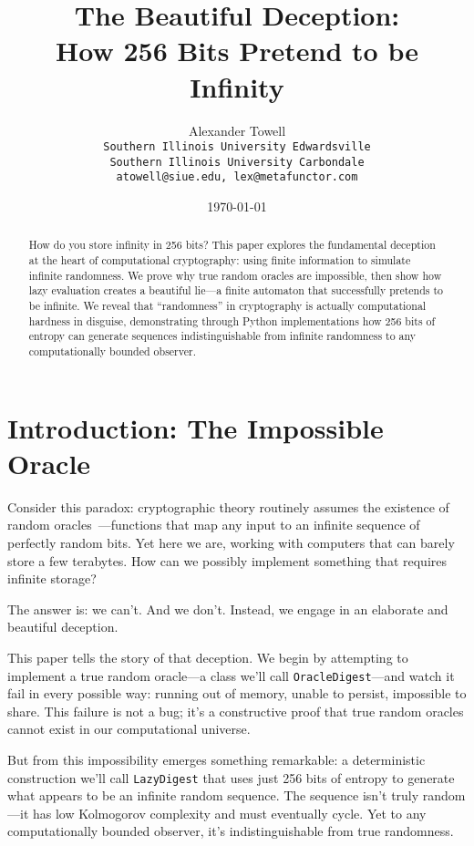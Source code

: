 \documentclass[11pt]{article}
\title{The Beautiful Deception:\\
How 256 Bits Pretend to be Infinity}
\author{
    Alexander Towell\\
    \texttt{Southern Illinois University Edwardsville}\\
    \texttt{Southern Illinois University Carbondale}\\
    \texttt{atowell@siue.edu, lex@metafunctor.com}
}
\date{\today}
\begin{document}
\maketitle

\begin{abstract}
How do you store infinity in 256 bits? This paper explores the fundamental deception at the heart of computational cryptography: using finite information to simulate infinite randomness. We prove why true random oracles are impossible, then show how lazy evaluation creates a beautiful lie---a finite automaton that successfully pretends to be infinite. We reveal that ``randomness'' in cryptography is actually computational hardness in disguise, demonstrating through Python implementations how 256 bits of entropy can generate sequences indistinguishable from infinite randomness to any computationally bounded observer.
\end{abstract}

\section{Introduction: The Impossible Oracle}

Consider this paradox: cryptographic theory routinely assumes the existence of random oracles~\cite{bellare1993random}---functions that map any input to an infinite sequence of perfectly random bits. Yet here we are, working with computers that can barely store a few terabytes. How can we possibly implement something that requires infinite storage?

The answer is: we can't. And we don't. Instead, we engage in an elaborate and beautiful deception.

This paper tells the story of that deception. We begin by attempting to implement a true random oracle---a class we'll call \texttt{OracleDigest}---and watch it fail in every possible way: running out of memory, unable to persist, impossible to share. This failure is not a bug; it's a constructive proof that true random oracles cannot exist in our computational universe.

But from this impossibility emerges something remarkable: a deterministic construction we'll call \texttt{LazyDigest} that uses just 256 bits of entropy to generate what appears to be an infinite random sequence. The sequence isn't truly random---it has low Kolmogorov complexity and must eventually cycle. Yet to any computationally bounded observer, it's indistinguishable from true randomness.
\end{document}
